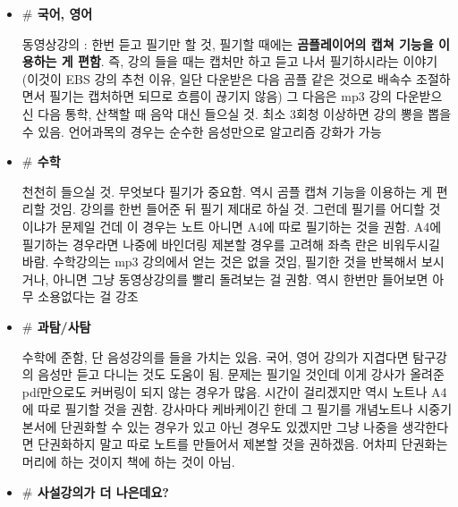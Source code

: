 \begin{itemize}
    
    \item[] \textbf{$\#$ 국어, 영어}
    \vspace{5mm}

    동영상강의 : 한번 듣고 필기만 할 것,
    필기할 때에는 \textbf{곰플레이어의 캡쳐 기능을 이용하는 게 편함}. 즉, 강의 들을 때는 캡처만 하고 듣고 나서 필기하시라는 이야기
    (이것이 EBS 강의 추천 이유, 일단 다운받은 다음 곰플 같은 것으로 배속수 조절하면서 필기는 캡처하면 되므로 흐름이 끊기지 않음)
    그 다음은 mp3 강의 다운받으신 다음 통학, 산책할 때 음악 대신 들으실 것. 최소 3회청 이상하면 강의 뽕을 뽑을 수 있음.
    언어과목의 경우는 순수한 음성만으로 알고리즘 강화가 가능
    \vspace{5mm}

    \item[] \textbf{$\#$ 수학}
    \vspace{5mm}

    천천히 들으실 것. 무엇보다 필기가 중요함.
    역시 곰플 캡쳐 기능을 이용하는 게 편리할 것임. 강의를 한번 들어준 뒤 필기 제대로 하실 것.
    그런데 필기를 어디할 것이냐가 문제일 건데 이 경우는 노트 아니면 A4에 따로 필기하는 것을 권함.
    A4에 필기하는 경우라면 나중에 바인더링 제본할 경우를 고려해 좌측 란은 비워두시길 바람.
    수학강의는 mp3 강의에서 얻는 것은 없을 것임, 필기한 것을 반복해서 보시거나, 아니면 그냥 동영상강의를 빨리 돌려보는 걸 권함.
    역시 한번만 들어보면 아무 소용없다는 걸 강조
    \vspace{5mm}

    \item[] \textbf{$\#$ 과탐/사탐}
    \vspace{5mm}

    수학에 준함, 단 음성강의를 들을 가치는 있음. 국어, 영어 강의가 지겹다면 탐구강의 음성만 듣고 다니는 것도 도움이 됨.
    문제는 필기일 것인데 이게 강사가 올려준 pdf만으로도 커버링이 되지 않는 경우가 많음.
    시간이 걸리겠지만 역시 노트나 A4에 따로 필기할 것을 권함.
    강사마다 케바케이긴 한데 그 필기를 개념노트나 시중기본서에 단권화할 수 있는 경우가 있고 아닌 경우도 있겠지만
    그냥 나중을 생각한다면 단권화하지 말고 따로 노트를 만들어서 제본할 것을 권하겠음.
    어차피 단권화는 머리에 하는 것이지 책에 하는 것이 아님.
    \vspace{5mm}

    \item[] \textbf{$\#$ 사설강의가 더 나은데요?}
    \vspace{5mm}


\end{itemize}
